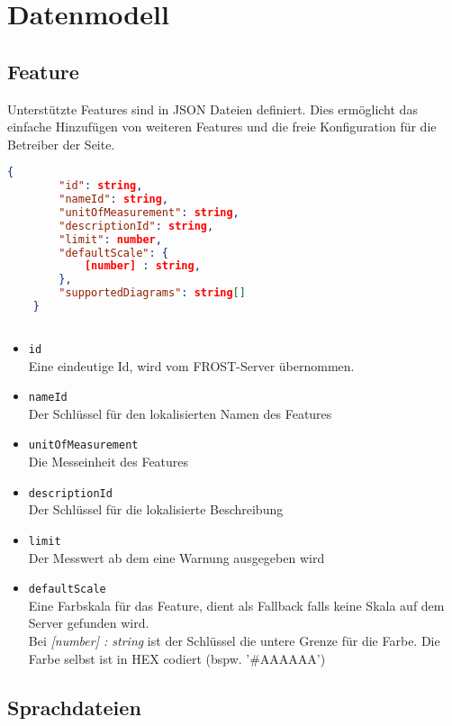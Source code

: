 \section{Datenmodell}
\subsection{Feature}

Unterstützte Features sind in JSON Dateien definiert.
Dies ermöglicht das einfache Hinzufügen von weiteren Features und die freie Konfiguration für die Betreiber der Seite.


\begin{lstlisting}[language=json,firstnumber=1]
    {
	    "id": string,
	    "nameId": string,
	    "unitOfMeasurement": string,
	    "descriptionId": string,
	    "limit": number,
	    "defaultScale": {
		    [number] : string,
	    },
	    "supportedDiagrams": string[]
    }
    
\end{lstlisting}

\begin{itemize}
	\item \texttt{id} 
	\\ Eine eindeutige Id, wird vom FROST-Server übernommen.
	\item \texttt{nameId} 
	\\ Der Schlüssel für den lokalisierten Namen des Features
	\item \texttt{unitOfMeasurement} 
	\\ Die Messeinheit des Features
	\item \texttt{descriptionId} 
	\\ Der Schlüssel für die lokalisierte Beschreibung
	\item \texttt{limit} 
	\\ Der Messwert ab dem eine Warnung ausgegeben wird
	\item \texttt{defaultScale} 
	\\ Eine Farbskala für das Feature, dient als Fallback falls keine Skala auf dem Server gefunden wird.
	\\ Bei \emph{[number] : string} ist der Schlüssel die untere Grenze für die Farbe.
	Die Farbe selbst ist in HEX codiert (bspw. '\#AAAAAA') 
\end{itemize}
\newpage
\subsection{Sprachdateien}


